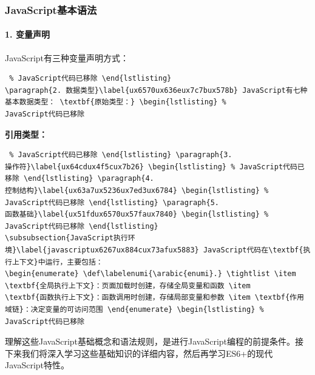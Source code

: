 \subsubsection{JavaScript基本语法}\label{javascriptux57faux672cux8bedux6cd5} \paragraph{1.
变量声明}\label{ux53d8ux91cfux58f0ux660e} JavaScript有三种变量声明方式： \begin{lstlisting} % JavaScript代码已移除 \end{lstlisting}
\paragraph{2. 数据类型}\label{ux6570ux636eux7c7bux578b} JavaScript有七种基本数据类型： \textbf{原始类型：} \begin{lstlisting} %
JavaScript代码已移除 \end{lstlisting} \textbf{引用类型：} \begin{lstlisting} % JavaScript代码已移除 \end{lstlisting} \paragraph{3.
操作符}\label{ux64cdux4f5cux7b26} \begin{lstlisting} % JavaScript代码已移除 \end{lstlisting} \paragraph{4.
控制结构}\label{ux63a7ux5236ux7ed3ux6784} \begin{lstlisting} % JavaScript代码已移除 \end{lstlisting} \paragraph{5.
函数基础}\label{ux51fdux6570ux57faux7840} \begin{lstlisting} % JavaScript代码已移除 \end{lstlisting}
\subsubsection{JavaScript执行环境}\label{javascriptux6267ux884cux73afux5883} JavaScript代码在\textbf{执行上下文}中运行，主要包括：
\begin{enumerate} \def\labelenumi{\arabic{enumi}.} \tightlist \item \textbf{全局执行上下文}：页面加载时创建，存储全局变量和函数 \item
\textbf{函数执行上下文}：函数调用时创建，存储局部变量和参数 \item \textbf{作用域链}：决定变量的可访问范围 \end{enumerate} \begin{lstlisting} % JavaScript代码已移除
\end{lstlisting} 理解这些JavaScript基础概念和语法规则，是进行JavaScript编程的前提条件。接下来我们将深入学习这些基础知识的详细内容，然后再学习ES6+的现代JavaScript特性。
